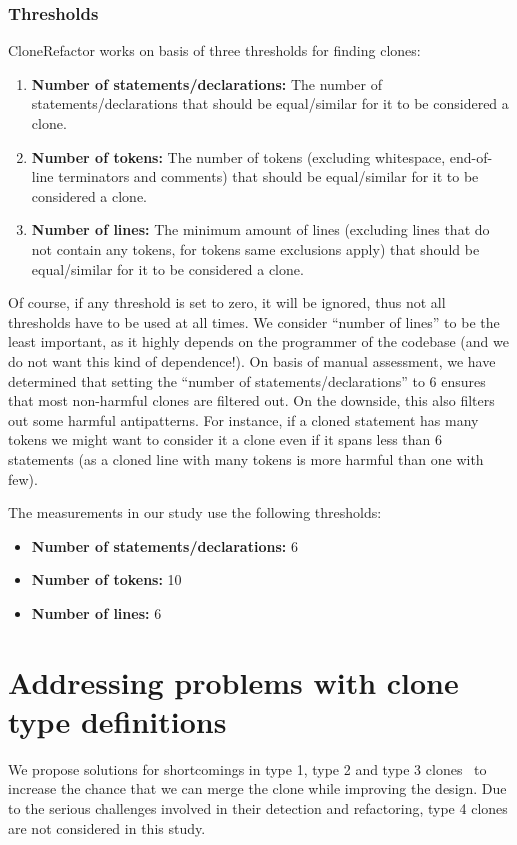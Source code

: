 \documentclass[a4paper]{article}
\begin{document}
\subsubsection{Thresholds}\label{chap:thresholds}
CloneRefactor works on basis of three thresholds for finding clones:
\begin{enumerate}
  \item \textbf{Number of statements/declarations:} The number of statements/declarations that should be equal/similar for it to be considered a clone.
  \item \textbf{Number of tokens:} The number of tokens (excluding whitespace, end-of-line terminators and comments) that should be equal/similar for it to be considered a clone.
  \item \textbf{Number of lines:} The minimum amount of lines (excluding lines that do not contain any tokens, for tokens same exclusions apply) that should be equal/similar for it to be considered a clone.
\end{enumerate}
Of course, if any threshold is set to zero, it will be ignored, thus not all thresholds have to be used at all times. We consider ``number of lines'' to be the least important, as it highly depends on the programmer of the codebase (and we do not want this kind of dependence!). On basis of manual assessment, we have determined that setting the ``number of statements/declarations'' to 6 ensures that most non-harmful clones are filtered out. On the downside, this also filters out some harmful antipatterns. For instance, if a cloned statement has many tokens we might want to consider it a clone even if it spans less than 6 statements (as a cloned line with many tokens is more harmful than one with few).

The measurements in our study use the following thresholds:
\begin{itemize}
  \item \textbf{Number of statements/declarations:} 6
  \item \textbf{Number of tokens:} 10
  \item \textbf{Number of lines:} 6
\end{itemize}

\section{Addressing problems with clone type definitions}\label{chap:clonetypes}
We propose solutions for shortcomings in type 1, type 2 and type 3 clones~\cite{roy2007survey} to increase the chance that we can merge the clone while improving the design. Due to the serious challenges involved in their detection and refactoring, type 4 clones are not considered in this study.
\end{document}
